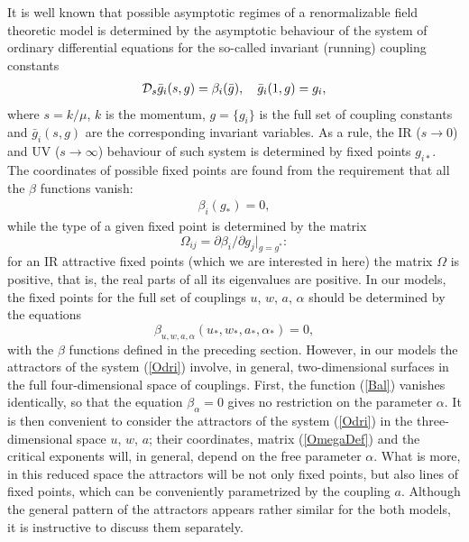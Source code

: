 \documentclass[12pt]{iopart}
\def\D{{\cal D}}
\begin{document}
It is well known that possible asymptotic regimes of a renormalizable field
theoretic model is determined by the asymptotic behaviour of the system of
ordinary differential equations for the so-called invariant (running)
coupling constants
\begin{eqnarray}
\D_s \bar g_{i}(s,g) = \beta_{i} (\bar g), \quad \bar g_{i}(1,g) = g_{i},
\label{Odri}
\end{eqnarray}
where $s=k/\mu$, $k$ is the momentum,
$g= \{g_{i}\}$ is the full set of coupling constants and
$\bar g_{i}(s,g)$ are the corresponding invariant variables. As a rule,
the IR ($s\to0$) and UV ($s\to\infty$) behaviour of such system is
determined by fixed points $g_{i*}$. The coordinates of possible fixed
points are found from the requirement that all the $\beta$ functions vanish:
\begin{eqnarray}
\beta_{i} (g_{*}) =0,
\label{fp}
\end{eqnarray}
while the type of a given fixed point is determined by the matrix
\begin{equation}
\Omega_{ij} = \partial\beta_{i}/\partial g_{j} |_{g=g^*}:
\label{OmegaDef}
\end{equation}
for an IR attractive fixed points (which we are interested in here) the
matrix $\Omega$ is positive, that is, the real parts of all its eigenvalues
are positive. In our models, the fixed points for the full set of couplings
$u$, $w$, $a$, $\alpha$ should be determined by the equations
\begin{equation}
\beta_{u,w,a,\alpha} (u_{*},w_{*},a_{*},\alpha_{*}) = 0,
\label{points}
\end{equation}
with the $\beta$ functions defined in the preceding section. However, in our
models the attractors of the system (\ref{Odri}) involve, in general,
two-dimensional surfaces in the full four-dimensional space of couplings.
First, the function (\ref{Bal}) vanishes identically, so that the
equation $\beta_{\alpha}=0$ gives no restriction on the parameter $\alpha$.
It is then convenient to consider the attractors of the system (\ref{Odri})
in the three-dimensional space $u$, $w$, $a$; their coordinates, matrix
(\ref{OmegaDef}) and the critical exponents will, in general, depend on
the free parameter $\alpha$. What is more, in this reduced space the
attractors will be not only fixed points, but also lines of fixed points,
which can be conveniently parametrized by the coupling $a$. Although the
general pattern of the attractors appears rather similar for the both
models, it is instructive to discuss them separately.
\end{document}
